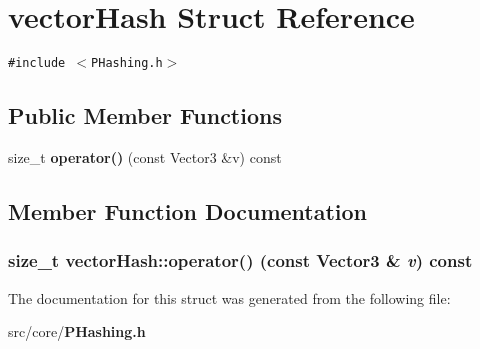 \section{vector\-Hash Struct Reference}
\label{structvectorHash}
{\tt \#include $<$PHashing.h$>$}

\subsection*{Public Member Functions}
\begin{CompactItemize}
\item 
size\_\-t {\bf operator()} (const Vector3 \&v) const 
\end{CompactItemize}


\subsection{Member Function Documentation}
\subsubsection{\setlength{\rightskip}{0pt plus 5cm}size\_\-t vector\-Hash::operator() (const Vector3 \& {\em v}) const\hspace{0.3cm}{\tt  [inline]}}\label{structvectorHash_35d011ed431ee6fedf0b26a8e7b7a2e0}




The documentation for this struct was generated from the following file:\begin{CompactItemize}
\item 
src/core/{\bf PHashing.h}\end{CompactItemize}
